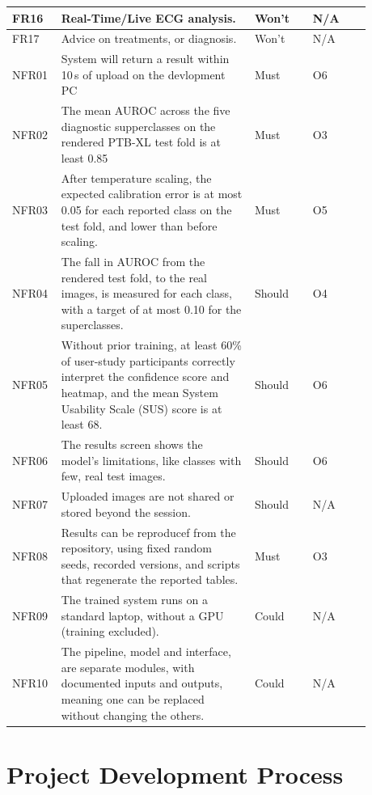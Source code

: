 \begin{table}[ht]
\begin{tabular}{|p{0.08\linewidth}|p{0.5\linewidth}|p{0.15\linewidth}|p{0.15\linewidth}|}
    \hline
    FR16 & Real-Time/Live ECG analysis. & Won't & N/A \\ %
    \hline
    FR17 & Advice on treatments, or diagnosis.  & Won't & N/A \\
    \hline
    NFR01 & System will return a result within 10\,s of upload on the devlopment PC & Must & O6 \\
    \hline
    NFR02 & The mean AUROC across the five diagnostic supperclasses on the rendered PTB-XL test fold is at least 0.85 & Must & O3 \\
    \hline
    NFR03 & After temperature scaling, the expected calibration error is at most 0.05 for each reported class on the test fold, and lower than before scaling. & Must & O5 \\
    \hline
    NFR04 & The fall in AUROC from the rendered test fold, to the real images, is measured for each class, with a target of at most 0.10 for the superclasses. & Should & O4 \\
    \hline   
    NFR05 & Without prior training, at least 60\% of user-study participants correctly interpret the confidence score and heatmap, and the mean System Usability Scale (SUS) score is at least 68. & Should & O6 \\
    \hline 
    NFR06 & The results screen shows the model's limitations, like classes with few, real test images. & Should & O6 \\
    \hline
    NFR07 & Uploaded images are not shared or stored beyond the session. & Should & N/A \\
    \hline
    NFR08 & Results can be reproducef from the repository, using fixed random seeds, recorded versions, and scripts that regenerate the reported tables. & Must & O3 \\
    \hline
    NFR09 & The trained system runs on a standard laptop, without a GPU (training excluded). & Could & N/A \\
    \hline
    NFR10 & The pipeline, model and interface, are separate modules, with documented inputs and outputs, meaning one can be replaced without changing the others. & Could & N/A \\
    \hline
  \end{tabular}
\end{table}

\section{ Project Development Process}
\label{sec:dev-plan}

